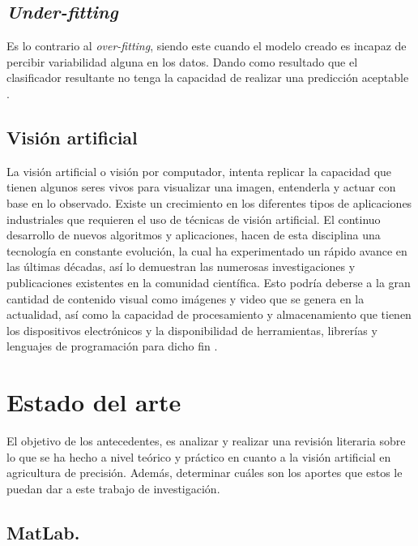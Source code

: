 \section{\textit{Under-fitting}}

Es lo contrario al \textit{over-fitting}, siendo este cuando el modelo creado es incapaz de percibir variabilidad alguna en los datos. Dando como resultado que el clasificador resultante no tenga la capacidad de realizar una predicción aceptable \cite{jabbar2015methods}.

\section{Visión artificial} La visión artificial o visión por computador, intenta replicar la capacidad que tienen algunos seres vivos para visualizar una imagen, entenderla y actuar con base en lo observado. Existe un crecimiento en los diferentes tipos de aplicaciones industriales que requieren el uso de técnicas de visión artificial. El continuo desarrollo de nuevos algoritmos y aplicaciones, hacen de esta disciplina una tecnología en constante evolución, la cual ha experimentado un rápido avance en las últimas décadas, así lo demuestran las numerosas investigaciones y publicaciones existentes en la comunidad científica.  Esto podría deberse a la gran cantidad de contenido visual como imágenes y video que se genera en la actualidad, así como la capacidad de procesamiento y almacenamiento que tienen los dispositivos electrónicos y la disponibilidad de herramientas, librerías y lenguajes de programación para dicho fin \cite{ref_15}.






\chapter{Estado del arte}

El objetivo de los antecedentes, es analizar y realizar una revisión literaria sobre lo que se ha hecho a nivel teórico y práctico en cuanto a la visión artificial en agricultura de precisión.  Además, determinar cuáles son los aportes que estos le puedan dar a este trabajo de investigación.


\section{MatLab.}

